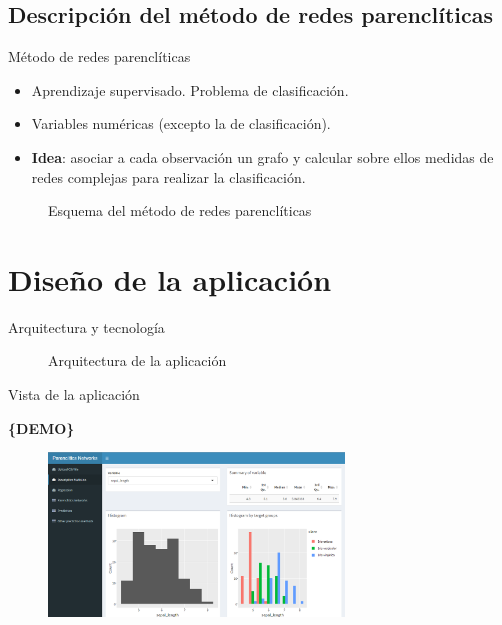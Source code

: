 \documentclass[hyperref={unicode}]{beamer}
\begin{document}
\subsection{Descripción del método de redes parenclíticas}
\begin{frame}{Método de redes parenclíticas}
	\begin{itemize}
	\item Aprendizaje supervisado. Problema de clasificación.
	\item Variables numéricas (excepto la de clasificación).
	\item \textbf{Idea}: asociar a cada observación un grafo y calcular sobre ellos medidas de redes complejas para realizar la clasificación. 
	\end{itemize}
	
	\begin{figure}[htbp!]
		\begin{center}
			\resizebox{\textwidth}{!}{%
				\redesparencliticas
			}
		\end{center}
		\caption{Esquema del método de redes parenclíticas}
		\label{fig:redesparencliticas}
	\end{figure}
\end{frame}



\section{Diseño de la aplicación}
\begin{frame}{Arquitectura y tecnología}
	\begin{figure}[htbp!]
		\centering
		\arquitectura
		\caption{Arquitectura de la aplicación}
		\label{fig:arquitectura}
	\end{figure}
\end{frame}


\begin{frame}{Vista de la aplicación}
	\begin{center}
	\Huge \color{ExecusharesBlue}\textbf{\{DEMO\}}
	\end{center}
	\begin{figure}[htbp!]
		\centering
		\includegraphics[width=0.7\textwidth]{../memoria/imagenes/descriptiva.png}
		\label{fig:aplicacion}
	\end{figure}
\end{frame}
\end{document}
